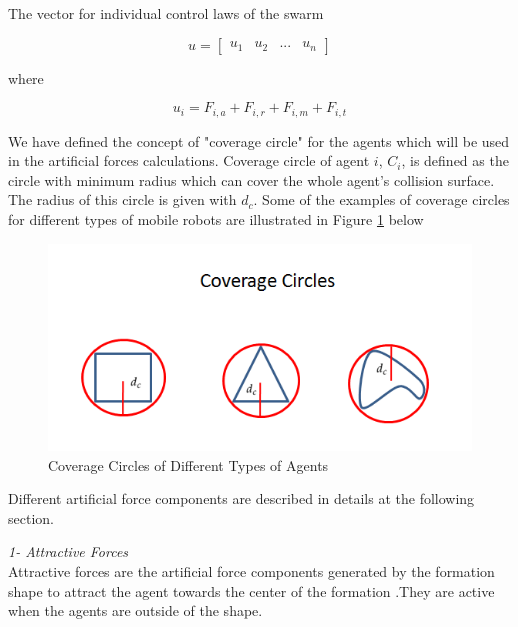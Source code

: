 The vector for individual control laws of the swarm

\begin{equation}
u = \begin{bmatrix}
u_1 & u_2 & ... & u_n
\end{bmatrix}
\end{equation}

where

\begin{equation}
u_i = F_{i,a} + F_{i,r} + F_{i,m} + F_{i,t}
\end{equation}

We have defined the concept of "coverage circle"	for the agents which will be used in the artificial forces calculations. Coverage circle of agent $i$, $C_i$, is defined as the circle with minimum radius which can cover the whole agent's collision surface. The radius of this circle is given with $d_c$. Some of the examples of coverage circles for different types of mobile robots are illustrated in Figure \ref{coverage_circle_ref} below
		
\begin{figure}[H]
\caption{Coverage Circles of Different Types of Agents} \label{coverage_circle_ref}
\centering
\includegraphics[scale = 0.60]{coverage_circles}
\end{figure}
		
Different artificial force components are described in details at the following section. \newline

\textit{			1- Attractive Forces} \\ 
Attractive forces are the artificial force components generated by the formation shape to attract the agent towards the center of the formation .They are active when the agents are outside of the shape. 

